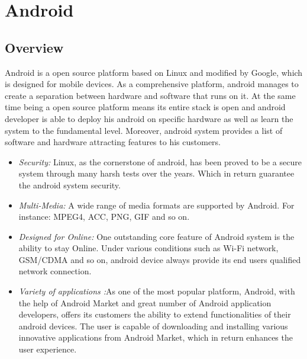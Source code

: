 \section{Android}
\subsection{Overview}
Android is a open source platform based on Linux and modified by Google, which is designed for mobile devices. As a comprehensive platform, android manages to create a separation between hardware and software that runs on it.  At the same time being a open source platform means its entire stack is open and android developer is able to deploy his android on specific hardware as well as learn the system to the fundamental level.\cite{learn_android}
Moreover, android system provides a list of software and hardware attracting features to his customers.
 \begin{itemize}
\item \emph{Security:} Linux, as the cornerstone of android, has been proved to be a secure system through many harsh tests over the years. Which in return guarantee the android system security. \cite{learn_android}
\item \emph{Multi-Media:} A wide range of media formats are supported by Android. For instance: MPEG4, ACC, PNG, GIF and so on. \cite{android_media}
\item \emph{Designed for Online:} One outstanding core feature of Android system is the ability to stay Online\cite{android_forensics}. Under various conditions such as Wi-Fi network, GSM/CDMA and so on, android device always provide its end users qualified network  connection.
\item \emph{Variety of applications :}As one of the most popular platform,  Android, with the help of Android Market and great number of Android application developers, offers its customers the ability to extend  functionalities of their android devices\cite{android_forensics}. The user is capable of downloading and installing various innovative applications from Android Market, which in return enhances the  user experience.
\end{itemize}
